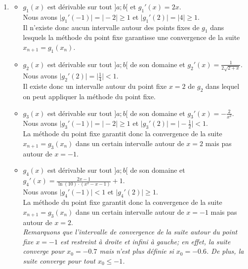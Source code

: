\documentclass[11pt,a4paper,twoside]{report}
\begin{document}
\begin{enumerate}[label=R4.\arabic*, font=\bfseries, itemsep=8mm,labelsep*=4mm]
\begin{enumerate}[label=\roman*),itemsep=3mm]
\item\begin{itemize}\setlength{\itemsep}{3mm}
\item $g_1(x)$ est dérivable sur tout $]a;b[$ et $g_1'(x)=2x$.\\ Nous avons $\vert g_1'(-1)\vert=\vert-2\vert \geqslant 1$ et $\vert g_1'(2)\vert=\vert 4\vert \geqslant1$.\\
Il n'existe donc aucun intervalle autour des points fixes de $g_1$ dans lesquels la méthode du point fixe garantisse une convergence de la suite $x_{n+1}=g_1(x_n)$.

\item
$g_2(x)$ est dérivable sur tout $]a;b[$ de son domaine et $\textstyle g_2'(x)=\frac{1}{2\sqrt{2+x}}$.\\ 
Nous avons $\textstyle \vert g_2'(2)\vert=\vert \frac{1}{4}\vert <1$.\\
Il existe donc un intervalle autour du point fixe $x=2$ de $g_2$ dans lequel on peut appliquer la méthode du point fixe. 

\item
$g_3(x)$ est dérivable sur tout $]a;b[$ de son domaine et $g_3'(x)=-\frac{2}{x^2}$.\\ 
Nous avons $\vert g_3'(-1)\vert=\vert-2\vert \geqslant 1$ et $\textstyle \vert g_3'(2)\vert=\vert -\frac{1}{2}\vert <1$.\\
La méthode du point fixe garantit donc la convergence de la suite $x_{n+1}=g_3(x_n)$ dans un certain intervalle autour de $x=2$ mais pas autour de $x=-1$. 

\item
$g_4(x)$ est dérivable sur tout $]a;b[$ de son domaine et $\textstyle g_4'(x)=\frac{2x-1}{\ln(10)\cdot(x^2-x-1)}+1$.\\ 
Nous avons $\vert g_4'(-1)\vert< 1$ et $\textstyle \vert g_4'(2)\vert \geqslant 1$.\\
La méthode du point fixe garantit donc la convergence de la suite $x_{n+1}=g_3(x_n)$ dans un certain intervalle autour de $x=-1$ mais pas autour de $x=2$.\\
\textit{\small Remarquons que l'intervalle de convergence de la suite autour du point fixe $x=-1$ est restreint à droite et infini à gauche; en effet, la suite converge pour $x_0=-0.7$ mais n'est plus définie si $x_0=-0.6$. De plus, la suite converge pour tout $x_0\leqslant -1$.}

\end{itemize}
\end{enumerate}








\end{enumerate}
\end{document}
